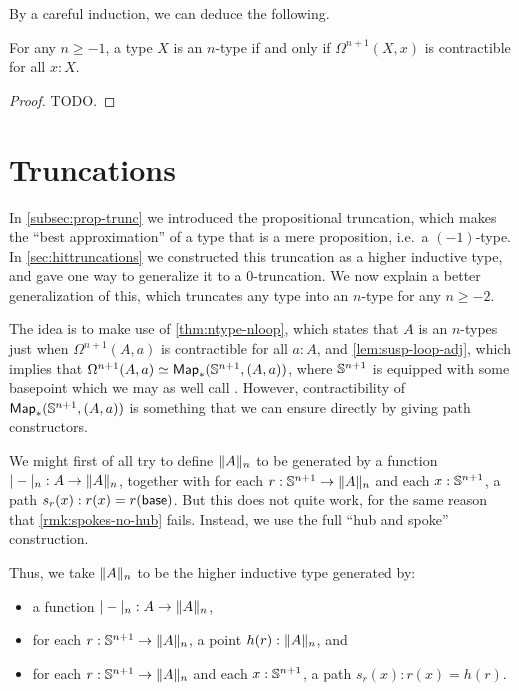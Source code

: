 By a careful induction, we can deduce the following.

\begin{thm}\label{thm:ntype-nloop}
  For any $n\ge -1$, a type $X$ is an $n$-type if and only if $\Omega^{n+1}(X,x)$ is contractible for all $x:X$.
\end{thm}
\begin{proof}
  TODO.
\end{proof}


\section{Truncations}
\label{sec:truncations}

In \autoref{subsec:prop-trunc} we introduced the propositional truncation, which makes the ``best approximation'' of a type that is a mere proposition, i.e.\ a $(-1)$-type.
In \autoref{sec:hittruncations} we constructed this truncation as a higher inductive type, and gave one way to generalize it to a 0-truncation.
We now explain a better generalization of this, which truncates any type into an $n$-type for any $n\geq -2$.

The idea is to make use of \autoref{thm:ntype-nloop}, which states that $A$ is an $n$-types just when $\Omega^{n+1}(A,a)$ is contractible for all $a:A$, and \autoref{lem:susp-loop-adj}, which implies that $\Omega^{n+1}(A,a) \simeq \Map_*(\Sn^{n+1},(A,a))$, where $\Sn^{n+1}$ is equipped with some basepoint which we may as well call \base.
However, contractibility of $\Map_*(\Sn^{n+1},(A,a))$ is something that we can ensure directly by giving path constructors.

We might first of all try to define $\trunc nA$ to be generated by a function $\tproj n- : A \to \trunc n A$, together with for each $r:\Sn^{n+1} \to \trunc n A$ and each $x:\Sn^{n+1}$, a path $s_r(x):r(x) = r(\base)$.
But this does not quite work, for the same reason that \autoref{rmk:spokes-no-hub} fails.
Instead, we use the full ``hub and spoke'' construction.

Thus, we take $\trunc nA$ to be the higher inductive type generated by:
\begin{itemize}
\item a function $\tproj n- : A \to \trunc n A$,
\item for each $r:\Sn^{n+1} \to \trunc n A$, a point $h(r):\trunc n A$, and
\item for each $r:\Sn^{n+1} \to \trunc n A$ and each $x:\Sn^{n+1}$, a path $s_r(x):r(x) = h(r)$.
\end{itemize}


